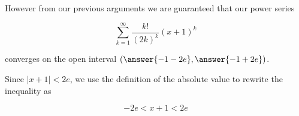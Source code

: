 \documentclass{ximera}
\begin{document}
\begin{exercise}
\begin{exercise}
\begin{exercise}
\begin{exercise}
 However from our previous arguments 
we are guaranteed that our power series 

\[
\sum_{k=1}^{\infty} \frac{k!  }{(2k)^k}(x+1)^{k}
\]


converges on the open interval $\left(  \answer{ -1-2e}, \answer{-1+2e} \right)$. 





\begin{hint}

Since $|x+1| < 2e$, we use the definition of the absolute value to rewrite the inequality as

\[
-2e< x+1 < 2e
\]


\end{hint}

\end{exercise}
\end{exercise}
\end{exercise}
\end{exercise}
\end{document}
